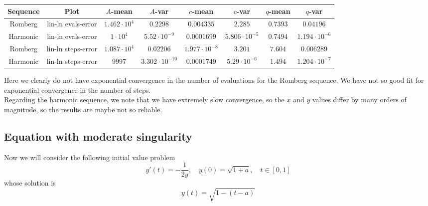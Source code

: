 \begin{table}[H]
    \centering
    \small
     \begin{tabular}{c|c||c|c|c|c|c|c}
Sequence & Plot & \(A\)-mean & \(A\)-var & \(c\)-mean & \(c\)-var & \(q\)-mean & \(q\)-var\\\hline
\rowcolor{red}
Romberg & lin-ln evals-error & \(1.462\cdot 10^4\) & \(0.2298\) & \(0.004335\) & \(2.285\) & \(0.7393\) & \(0.04196\) \\
\rowcolor{yellow}
Harmonic & lin-ln evals-error & \(1\cdot 10^4\) & \(5.52\cdot 10^{-9}\) & \(0.0001699\) & \(5.806\cdot 10^{-5}\) & \(0.7494\) & \(1.194\cdot 10^{-6}\) \\
\rowcolor{yellow}
Romberg & lin-ln steps-error & \(1.087\cdot 10^4\) & \(0.02206\) & \(1.977\cdot 10^{-8}\) & \(3.201\) & \(7.604\) & \(0.006289\) \\
\rowcolor{yellow}
Harmonic & lin-ln steps-error & \(9997\) & \(3.302\cdot 10^{-10}\) & \(0.0001749\) & \(5.29\cdot 10^{-6}\) & \(1.494\) & \(1.204\cdot 10^{-7}\) \\
    \end{tabular}
    \label{tab:my_label}
\end{table}

Here we clearly do not have exponential convergence in the number of evaluations for the Romberg sequence. We have not so good fit for exponential convergence in the number of steps.\\

Regarding the harmonic sequence, we note that we have extremely slow convergence, so the \(x\) and \(y\) values differ by many orders of magnitude, so the results are maybe not so reliable.

\subsection{Equation with moderate singularity}

Now we will consider the following initial value problem
\begin{equation}
y'(t) = -\frac{1}{2y}, \quad y(0) = \sqrt{1+a},\quad t\in [0,1]\label{47}
\end{equation}
whose solution is 
\[
y(t) = \sqrt{1 - (t-a)}
\]

